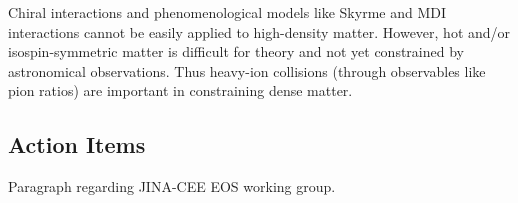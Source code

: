 \documentclass{revtex4}
\begin{document}
Chiral interactions and phenomenological models like Skyrme and MDI
interactions cannot be easily applied to high-density matter. However,
hot and/or isospin-symmetric matter is difficult for theory and not
yet constrained by astronomical observations. Thus heavy-ion
collisions (through observables like pion ratios) are important in
constraining dense matter.

\subsection{Action Items}

Paragraph regarding JINA-CEE EOS working group.
\end{document}
